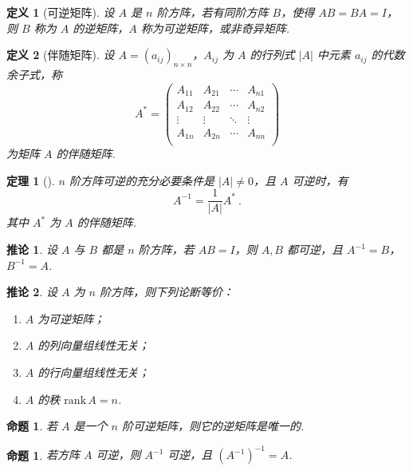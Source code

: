 \documentclass[zihao=-4,UTF8,linespread=1.8,nothm]{aytony_base}
\newtheorem{theorem}{\indent 定理}[subsection]
\newtheorem{proposition}{\indent 命题}[subsection]
\newtheorem*{proposition*}{\indent 命题}
\newtheorem*{corollary}{\indent 推论}
\newtheorem{definition}{\indent 定义}[subsection]
\begin{document}
\begin{definition}[可逆矩阵]
    设 $A$ 是 $n$ 阶方阵，若有同阶方阵 $B$，使得 $AB=BA=I$，则 $B$ 称为 $A$ 的逆矩阵，$A$ 称为可逆矩阵，或非奇异矩阵.
\end{definition}

\begin{definition}[伴随矩阵]
    设 $A = (a_{ij})_{n \times n}$，$A_{ij}$ 为 $A$ 的行列式 $|A|$ 中元素 $a_{ij}$ 的代数余子式，称 $$
        A^* = \left(
        \begin{matrix}
                A_{11} & A_{21} & \cdots & A_{n1} \\
                A_{12} & A_{22} & \cdots & A_{n2} \\
                \vdots & \vdots & \ddots & \vdots \\
                A_{1n} & A_{2n} & \cdots & A_{nn} \\\
            \end{matrix}
        \right)
    $$ 为矩阵 $A$ 的伴随矩阵.
\end{definition}

\begin{theorem}[]
    $n$ 阶方阵可逆的充分必要条件是 $|A| \neq 0$，且 $A$ 可逆时，有 $$
        A^{-1} = \dfrac{1}{|A|}A^*\ .
    $$ 其中 $A^*$ 为 $A$ 的伴随矩阵.
\end{theorem}

\begin{corollary}
    设 $A$ 与 $B$ 都是 $n$ 阶方阵，若 $AB = I$，则 $A, B$ 都可逆，且 $A^{-1} = B$，$B^{-1} = A$.
\end{corollary}

\begin{corollary}
    设 $A$ 为 $n$ 阶方阵，则下列论断等价：
    \begin{enumerate}[nosep]
        \item $A$ 为可逆矩阵；
        \item $A$ 的列向量组线性无关；
        \item $A$ 的行向量组线性无关；
        \item $A$ 的秩 $\mathrm{rank}\,A = n$.
    \end{enumerate}
\end{corollary}

\begin{proposition}
    若 $A$ 是一个 $n$ 阶可逆矩阵，则它的逆矩阵是唯一的.
\end{proposition}

\begin{proposition*}
    若方阵 $A$ 可逆，则 $A^{-1}$ 可逆，且 $(A^{-1})^{-1} = A$.
\end{proposition*}
\end{document}

